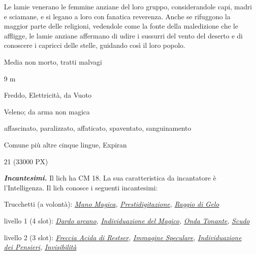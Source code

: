 \begin{multicols}{2}
{Le lamie venerano le femmine anziane del loro gruppo, considerandole capi, madri e sciamane, e si legano a loro con fanatica reverenza. Anche se rifuggono la maggior parte delle religioni, vedendole come la fonte della maledizione che le affligge, le lamie anziane affermano di udire i sussurri del vento del deserto e di conoscere i capricci delle stelle, guidando così il loro popolo.

\begin{description}[noitemsep, topsep=0pt, parsep=0pt, partopsep=0pt, itemsep=1pt, leftmargin=2.35cm,  labelwidth=2.2cm, itemindent=0cm, listparindent=0pt] %
\setlength{\baselineskip}{10pt}
\item[\textbf{Taglia/Tipo}] Media non morto, tratti malvagi
\item[\textbf{Caratt.}] 
\item[\textbf{Punti Ferita}] 
\item[\textbf{Movimento}] 9 m
\item[\textbf{Tiri Salvez.}] 
\item[\textbf{Res. Danni}] Freddo, Elettricità, da Vuoto
\item[\textbf{Imm. Danni}] Veleno; da arma non magica
\item[\textbf{Immunità}] affascinato, paralizzato, affaticato, spaventato, sanguinamento
\item[\textbf{Sensi}] 
\item[\textbf{Linguaggi}] Comune più altre cinque lingue, Expiran
\item[\textbf{Sfida}] 21 (33000 PX)
\end{description}
\smallskip

\emph{\textbf{Incantesimi.}} Il lich ha CM 18. La sua caratteristica da incantatore è l'Intelligenza. Il lich conosce i seguenti incantesimi:

Trucchetti (a volontà): \emph{\hyperlink{Mano Magica}{Mano Magica}, \hyperlink{Prestidigitazione}{Prestidigitazione}, \hyperlink{Raggio di Gelo}{Raggio di Gelo}}

livello 1 (4 slot): \emph{\hyperlink{Dardo arcano}{Dardo arcano}, \hyperlink{Individuazione del Magico}{Individuazione del Magico}, \hyperlink{Onda Tonante}{Onda Tonante}, \hyperlink{Scudo}{Scudo}}

livello 2 (3 slot): \emph{\hyperlink{Freccia Acida di Restser}{Freccia Acida di Restser}, \hyperlink{Immagine Speculare}{Immagine Speculare}, \hyperlink{Individuazione dei Pensieri}{Individuazione dei Pensieri}, \hyperlink{Invisibilità}{Invisibilità}}

}
\end{multicols}
